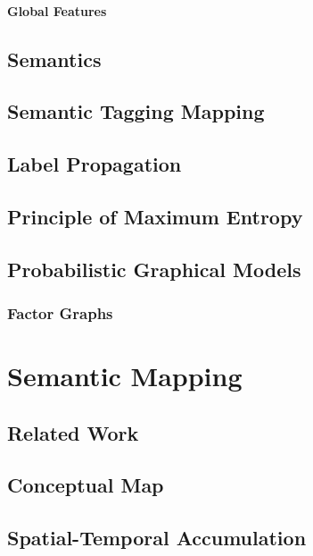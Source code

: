 \subsubsection{Global Features}


\section{Semantics}
\section{Semantic Tagging Mapping}
\section{Label Propagation}

\section{Principle of Maximum Entropy}

\section{Probabilistic Graphical Models}
\subsection{Factor Graphs}

\chapter{Semantic Mapping}
\section*{}
\section{Related Work}
\section{Conceptual Map}
\section{Spatial-Temporal Accumulation}

